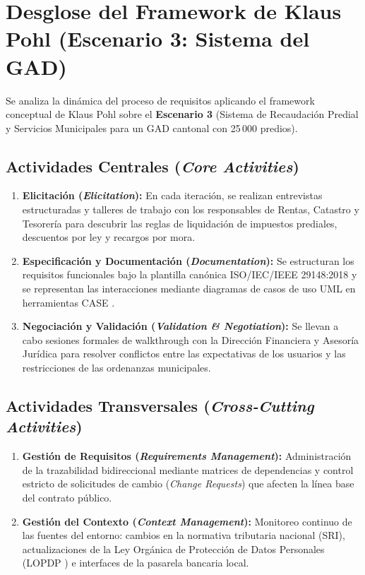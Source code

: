 \documentclass[conference]{IEEEtran}
\begin{document}
	\section{Desglose del Framework de Klaus Pohl (Escenario 3: Sistema del GAD)}
	Se analiza la dinámica del proceso de requisitos aplicando el framework conceptual de Klaus Pohl \cite{pohl2025} sobre el \textbf{Escenario 3} (Sistema de Recaudación Predial y Servicios Municipales para un GAD cantonal con 25\,000 predios).
	
	\subsection{Actividades Centrales (\emph{Core Activities})}
	\begin{enumerate}
		\item \textbf{Elicitación (\emph{Elicitation}):} En cada iteración, se realizan entrevistas estructuradas y talleres de trabajo con los responsables de Rentas, Catastro y Tesorería para descubrir las reglas de liquidación de impuestos prediales, descuentos por ley y recargos por mora.
		\item \textbf{Especificación y Documentación (\emph{Documentation}):} Se estructuran los requisitos funcionales bajo la plantilla canónica ISO/IEC/IEEE 29148:2018 y se representan las interacciones mediante diagramas de casos de uso UML en herramientas CASE \cite{ieee29148}.
		\item \textbf{Negociación y Validación (\emph{Validation \& Negotiation}):} Se llevan a cabo sesiones formales de walkthrough con la Dirección Financiera y Asesoría Jurídica para resolver conflictos entre las expectativas de los usuarios y las restricciones de las ordenanzas municipales.
	\end{enumerate}
	
	\subsection{Actividades Transversales (\emph{Cross-Cutting Activities})}
	\begin{enumerate}
		\item \textbf{Gestión de Requisitos (\emph{Requirements Management}):} Administración de la trazabilidad bidireccional mediante matrices de dependencias y control estricto de solicitudes de cambio (\emph{Change Requests}) que afecten la línea base del contrato público.
		\item \textbf{Gestión del Contexto (\emph{Context Management}):} Monitoreo continuo de las fuentes del entorno: cambios en la normativa tributaria nacional (SRI), actualizaciones de la Ley Orgánica de Protección de Datos Personales (LOPDP \cite{lopdp2021}) e interfaces de la pasarela bancaria local.
	\end{enumerate}
	
\end{document}
